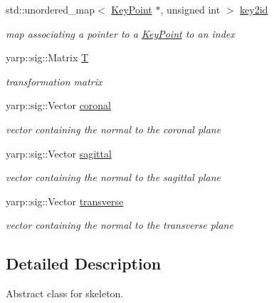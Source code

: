 \begin{DoxyCompactItemize}
std\+::unordered\+\_\+map$<$ \mbox{\hyperlink{classassistive__rehab_1_1KeyPoint}{Key\+Point}} $\ast$, unsigned int $>$ \mbox{\hyperlink{classassistive__rehab_1_1Skeleton_a4b1c3607cabb58053e4c367015e98e28}{key2id}}
\begin{DoxyCompactList}\small\item\em map associating a pointer to a \mbox{\hyperlink{classassistive__rehab_1_1KeyPoint}{Key\+Point}} to an index \end{DoxyCompactList}\item 
\mbox{\label{classassistive__rehab_1_1Skeleton_a358a1c5eb23a562f8558ff8d43583ef7}} 
yarp\+::sig\+::\+Matrix \mbox{\hyperlink{classassistive__rehab_1_1Skeleton_a358a1c5eb23a562f8558ff8d43583ef7}{T}}
\begin{DoxyCompactList}\small\item\em transformation matrix \end{DoxyCompactList}\item 
\mbox{\label{classassistive__rehab_1_1Skeleton_ad042a7e60e6d72cc87b06c5fb0bdfae2}} 
yarp\+::sig\+::\+Vector \mbox{\hyperlink{classassistive__rehab_1_1Skeleton_ad042a7e60e6d72cc87b06c5fb0bdfae2}{coronal}}
\begin{DoxyCompactList}\small\item\em vector containing the normal to the coronal plane \end{DoxyCompactList}\item 
\mbox{\label{classassistive__rehab_1_1Skeleton_a72d6ccb619619e77a17258b08496a972}} 
yarp\+::sig\+::\+Vector \mbox{\hyperlink{classassistive__rehab_1_1Skeleton_a72d6ccb619619e77a17258b08496a972}{sagittal}}
\begin{DoxyCompactList}\small\item\em vector containing the normal to the sagittal plane \end{DoxyCompactList}\item 
\mbox{\label{classassistive__rehab_1_1Skeleton_ab8a9bf9297f520e8de801248e0b8d2dd}} 
yarp\+::sig\+::\+Vector \mbox{\hyperlink{classassistive__rehab_1_1Skeleton_ab8a9bf9297f520e8de801248e0b8d2dd}{transverse}}
\begin{DoxyCompactList}\small\item\em vector containing the normal to the transverse plane \end{DoxyCompactList}\end{DoxyCompactItemize}


\subsection{Detailed Description}
Abstract class for skeleton. 

